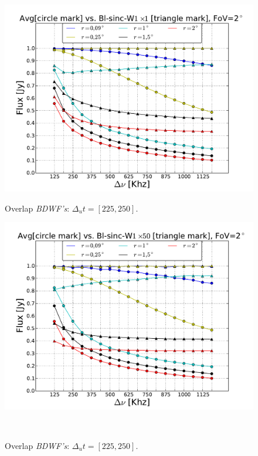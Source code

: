 \documentclass[useAMS,usenatbib]{mn2e}
\begin{document}
\begin{figure}
  \centering
\begin{minipage}{0.45\linewidth}\includegraphics[width=1\textwidth]{./Figures/max-integ-freq-sinc-w1x1-fov2.pdf}\caption{Overlap 
		\textit{BDWF's}: $\Delta_u t= [225, 250]$.}\label{ fig:fig_3a}\end{minipage}
\begin{minipage}{0.45\linewidth}\includegraphics[width=1\textwidth]{./Figures/max-integ-time-sinc-w1x50-fov2.pdf}\caption{Overlap 
		\textit{BDWF's}: $\Delta_u t= [225, 250]$.}\label{ fig:fig_3a}\end{minipage}\\

\end{figure}
\end{document}
